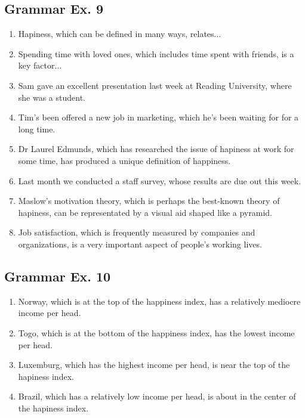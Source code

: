 \documentclass[12pt, a4paper, oneside]{article}
\begin{document}
  \subsection{Grammar Ex. 9}
  \begin{enumerate}[1.]
    \item Hapiness, which can be defined in many ways, relates...
    \item Spending time with loved ones, which includes time spent with friends, is a key factor...
    \item Sam gave an excellent presentation last week at Reading University, where she was a student.
    \item Tim's been offered a new job in marketing, which he's been waiting for for a long time.
    \item Dr Laurel Edmunds, which has researched the issue of hapiness at work for some time, has produced a unique definition of happiness.
    \item Last month we conducted a staff survey, whose results are due out this week.
    \item Maslow's motivation theory, which is perhaps the best-known theory of hapiness, can be representated by a visual aid shaped like a pyramid.
    \item Job satisfaction, which is frequently measured by companies and organizations, is a very important aspect of people's working lives.
  \end{enumerate}

  \subsection{Grammar Ex. 10}
  \begin{enumerate}[1.]
    \item Norway, which is at the top of the happiness index, has a relatively mediocre income per head.
    \item Togo, which is at the bottom of the happiness index, has the lowest income per head.
    \item Luxemburg, which has the highest income per head, is near the top of the hapiness index.
    \item Brazil, which has a relatively low income per head, is about in the center of the hapiness index.
  \end{enumerate}
\end{document}
